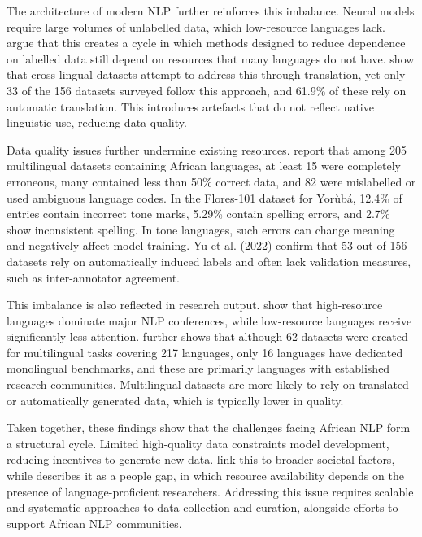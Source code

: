 \documentclass[11pt,a4paper]{article}
\begin{document}
The architecture of modern NLP further reinforces this imbalance. Neural models require large volumes of unlabelled data, which low-resource languages lack. \citet{joshi2020state} argue that this creates a cycle in which methods designed to reduce dependence on labelled data still depend on resources that many languages do not have. \citet{yu2022beyond} show that cross-lingual datasets attempt to address this through translation, yet only 33 of the 156 datasets surveyed follow this approach, and 61.9\% of these rely on automatic translation. This introduces artefacts that do not reflect native linguistic use, reducing data quality.

Data quality issues further undermine existing resources. \citet{adebara2022towards} report that among 205 multilingual datasets containing African languages, at least 15 were completely erroneous, many contained less than 50\% correct data, and 82 were mislabelled or used ambiguous language codes. In the Flores-101 dataset for Yorùbá, 12.4\% of entries contain incorrect tone marks, 5.29\% contain spelling errors, and 2.7\% show inconsistent spelling. In tone languages, such errors can change meaning and negatively affect model training. Yu et al. (2022) confirm that 53 out of 156 datasets rely on automatically induced labels and often lack validation measures, such as inter-annotator agreement.

This imbalance is also reflected in research output. \citet{joshi2020state} show that high-resource languages dominate major NLP conferences, while low-resource languages receive significantly less attention. \citet{yu2022beyond} further shows that although 62 datasets were created for multilingual tasks covering 217 languages, only 16 languages have dedicated monolingual benchmarks, and these are primarily languages with established research communities. Multilingual datasets are more likely to rely on translated or automatically generated data, which is typically lower in quality.

Taken together, these findings show that the challenges facing African NLP form a structural cycle. Limited high-quality data constraints model development, reducing incentives to generate new data. \citet{nekoto2020participatory} link this to broader societal factors, while \citet{yu2022beyond} describes it as a people gap, in which resource availability depends on the presence of language-proficient researchers. Addressing this issue requires scalable and systematic approaches to data collection and curation, alongside efforts to support African NLP communities.
\end{document}
